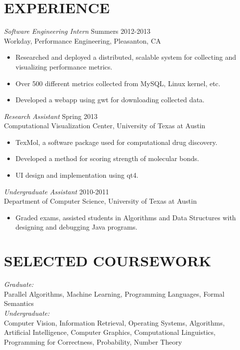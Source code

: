 \documentclass[line,margin]{res}
\begin{document}
\begin{resume}
\section{EXPERIENCE} {\sl Software Engineering Intern} \hfill Summers 2012-2013 \\
                Workday, 
                Performance Engineering, Pleasanton, CA
                 \begin{itemize}  \itemsep -2pt %
                 \item Researched and deployed a distributed, scalable system for collecting and visualizing performance metrics.
								 \item Over 500 different metrics collected from MySQL, Linux kernel, etc.
                 \item Developed a webapp using gwt for downloading collected data.
                \end{itemize}

                {\sl Research Assistant } \hfill Spring 2013 \\
                Computational Visualization Center, University of Texas at Austin
                \begin{itemize} \itemsep -2pt
                    \item TexMol, a software package used for computational drug discovery.
                    \item Developed a method for scoring strength of molecular bonds.
                    \item UI design and implementation using qt4.
                 \end{itemize}
        
 
                {\sl Undergraduate Assistant} \hfill        2010-2011 \\
                Department of Computer Science, University of Texas at Austin
                  \begin{itemize} \itemsep -2pt
                   \item Graded exams, assisted students in Algorithms and Data Structures with designing and debugging Java programs.
                   \end{itemize} 
 
\section{SELECTED COURSEWORK} {\sl Graduate:} \\ Parallel Algorithms, Machine Learning, Programming Languages, Formal Semantics \\
															{\sl Undergraduate:} \\ Computer Vision, Information Retrieval, Operating Systems, Algorithms, 
															Artificial Intelligence, Computer Graphics, Computational Linguistics, Programming for Correctness, 
															Probability, Number Theory \\


\end{resume}
\end{document}
